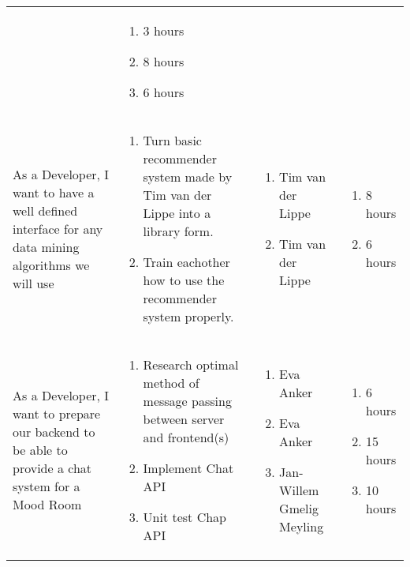 \documentclass[11pt,a4paper]{article}
\begin{document}
\begin{table}[h]
\begin{tabular}{|p{4.5cm}|p{7cm}|p{4cm}|p{2.6cm}|}
& 
\begin{enumerate}
\item 3 hours
\item 8 hours
\item 6 hours
\end{enumerate} \\

As a Developer, I want to have a well defined interface for any data mining algorithms we will use & \begin{enumerate}
\item Turn basic recommender system made by Tim van der Lippe into a library form.
\item Train eachother how to use the recommender system properly.
\end{enumerate}

& 
\begin{enumerate}
\item Tim van der Lippe
\item Tim van der Lippe
\end{enumerate}

& 
\begin{enumerate}
\item 8 hours
\item 6 hours
\end{enumerate} \\

As a Developer, I want to prepare our backend to be able to provide a chat system for a Mood Room & \begin{enumerate}
\item Research optimal method of message passing between server and frontend(s)
\item Implement Chat API
\item Unit test Chap API
\end{enumerate}

& 
\begin{enumerate}
\item Eva Anker
\item Eva Anker
\item Jan-Willem Gmelig Meyling
\end{enumerate}

& 
\begin{enumerate}
\item 6 hours
\item 15 hours
\item 10 hours
\end{enumerate} \\
           
\end{tabular}
\end{table}
\end{document}
